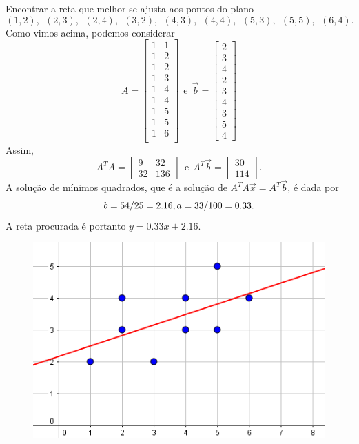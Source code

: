 \begin{ex}
  Encontrar a reta que melhor se ajusta aos pontos do plano
  \begin{equation}
  (1,2), \ \ (2,3), \ \ (2,4), \ \ (3,2), \ \ (4,3), \ \ (4,4), \ \ (5,3), \ \ (5,5), \ \ (6,4).
  \end{equation} Como vimos acima, podemos considerar
  \begin{equation}
  A =
  \begin{bmatrix}
    1 & 1 \\
    1 & 2 \\
    1 & 2 \\
    1 & 3 \\
    1 & 4 \\
    1 & 4 \\
    1 & 5 \\
    1 & 5 \\
    1 & 6 \\
  \end{bmatrix} \ \ \text{e} \ \
  \vec{b} =
  \begin{bmatrix}
    2\\3\\4\\2\\3\\4\\3\\5\\4
  \end{bmatrix}
  \end{equation} Assim,
  \begin{equation}
  A^T A =
  \begin{bmatrix}
    9  & 32  \\
    32  & 136
  \end{bmatrix}  \ \ \text{e} \ \
  A^T \vec{b} =
  \begin{bmatrix}
    30\\114
  \end{bmatrix}.
  \end{equation} A solução de mínimos quadrados, que é a solução de $A^T A \vec{x} = A^T\vec{b}$, é dada por
  \begin{equation}
  b = 54/25 = 2.16, \\ a = 33/100 = 0.33.
  \end{equation} A reta procurada é portanto $y = 0.33 x + 2.16$.
  \begin{figure}[h!]
    \begin{center}
      \includegraphics[width=0.5\linewidth]{Semana13/semana13-reta}
    \end{center}
  \end{figure}
\end{ex}


